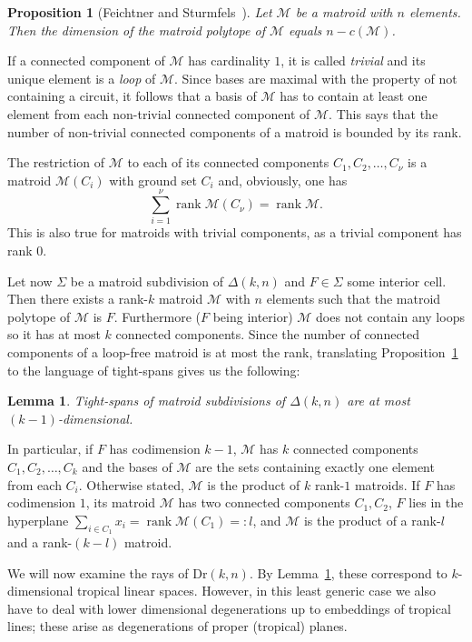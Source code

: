 \documentclass[11pt,a4paper]{amsart}
\newcommand{\cM}{{\mathcal{M}}}
\DeclareMathOperator{\rank}{rank}
\newcommand{\Hypersimplex}[2]{{\Delta(#1,#2)}}
\newcommand{\Dr}[2]{{\mathrm{Dr}(#1,#2)}}
\theoremstyle{plain}
\newtheorem{proposition}[theorem]{Proposition}
\newtheorem{lemma}[theorem]{Lemma}
\theoremstyle{definition}
\begin{document}
\begin{proposition}[{Feichtner and Sturmfels~\cite[Prop.~2.4]{MR2191630}}]\label{prop:dimension}
  Let $\cM$ be a matroid with $n$ elements. Then the
  dimension of the matroid polytope of $\cM$ equals $n-c(\cM)$.
\end{proposition}

If a connected component of $\cM$ has cardinality $1$, it is called \emph{trivial} and its unique
element is a \emph{loop} of $\cM$. Since bases are maximal with the property of not containing a
circuit, it follows that a basis of $\cM$ has to contain at least one element from each non-trivial
connected component of $\cM$. This says that the number of non-trivial connected components of a
matroid is bounded by its rank.
 
The restriction of $\cM$ to each of its connected components $C_1,C_2,\dots,C_\nu$ is a matroid
$\cM(C_i)$ with ground set $C_i$ and, obviously, one has
\[
\sum_{i=1}^{\nu} \rank \cM(C_\nu)=\rank \cM.
\]
This is also true for matroids with trivial components, as a trivial component has rank $0$.
 
Let now $\Sigma$ be a matroid subdivision of $\Hypersimplex kn$ and $F\in\Sigma$ some interior cell.
Then there exists a rank-$k$ matroid $\cM$ with $n$ elements such that the matroid polytope of $\cM$
is $F$.  Furthermore ($F$ being interior) $\cM$ does not contain any loops so it has at most $k$
connected components.  Since the number of connected components of a loop-free matroid is at most
the rank, translating Proposition~\ref{prop:dimension} to the language of tight-spans gives us the
following:

\begin{lemma}\label{lem:dimension}
  Tight-spans of matroid subdivisions of $\Hypersimplex kn$ are at most $(k{-}1)$-dimensional.
\end{lemma}

In particular, if $F$ has codimension $k-1$, $\cM$ has $k$ connected components $C_1,C_2,\dots,C_k$ and
the bases of $\cM$ are the sets containing exactly one element from each $C_i$. Otherwise stated,
$\cM$ is the product of $k$ rank-$1$ matroids. If $F$ has codimension $1$, its matroid $\cM$ has two
connected components $C_1,C_2$, $F$ lies in the hyperplane $\sum_{i\in C_1}x_i=\rank \cM(C_1)=:l$,
and $\cM$ is the product of a rank-$l$ and a rank-$(k-l)$ matroid.

We will now examine the rays of $\Dr kn$. By Lemma~\ref{lem:dimension}, these correspond to
$k$-dimensional tropical linear spaces. However, in this least generic case we also have to deal
with lower dimensional degenerations up to embeddings of tropical lines; these arise as
degenerations of proper (tropical) planes.
\end{document}
